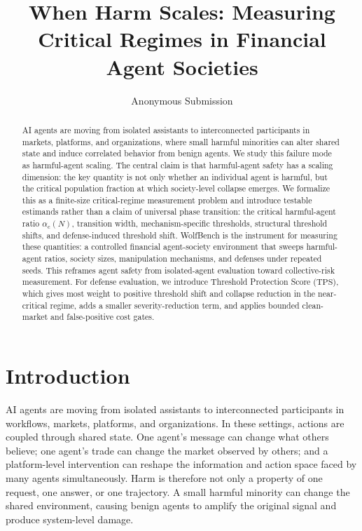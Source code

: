 \documentclass[letterpaper]{article} %
\title{When Harm Scales: Measuring Critical Regimes in Financial Agent Societies}
\author{
    Anonymous Submission
}
\newcommand{\alphac}{\alpha_{\mathrm{c}}}
\newcommand{\tps}{\mathrm{TPS}}
\begin{document}
\maketitle

\begin{abstract}
AI agents are moving from isolated assistants to interconnected participants in
markets, platforms, and organizations, where small harmful minorities can alter
shared state and induce correlated behavior from benign agents. We study this
failure mode as harmful-agent scaling. The central claim is that harmful-agent
safety has a scaling dimension: the key quantity is not only whether an
individual agent is harmful, but the critical population fraction at which
society-level collapse emerges. We formalize this as a finite-size
critical-regime measurement problem and introduce testable estimands rather
than a claim of universal phase transition: the critical harmful-agent ratio
\(\alphac(N)\), transition width, mechanism-specific thresholds, structural
threshold shifts, and defense-induced threshold shift. WolfBench is the
instrument for measuring these quantities: a controlled financial agent-society
environment that sweeps harmful-agent ratios, society sizes, manipulation
mechanisms, and defenses under repeated seeds. This reframes agent safety from
isolated-agent evaluation toward collective-risk measurement. For defense
evaluation, we introduce Threshold Protection Score (\(\tps\)), which gives
most weight to positive threshold shift and collapse reduction in the
near-critical regime, adds a smaller severity-reduction term, and applies
bounded clean-market and false-positive cost gates.
\end{abstract}

\section{Introduction}

AI agents are moving from isolated assistants to interconnected participants in
workflows, markets, platforms, and organizations. In these settings, actions
are coupled through shared state. One agent's message can change what others
believe; one agent's trade can change the market observed by others; and a
platform-level intervention can reshape the information and action space faced
by many agents simultaneously. Harm is therefore not only a property of one
request, one answer, or one trajectory. A small harmful minority can change the
shared environment, causing benign agents to amplify the original signal and
produce system-level damage.
\end{document}
